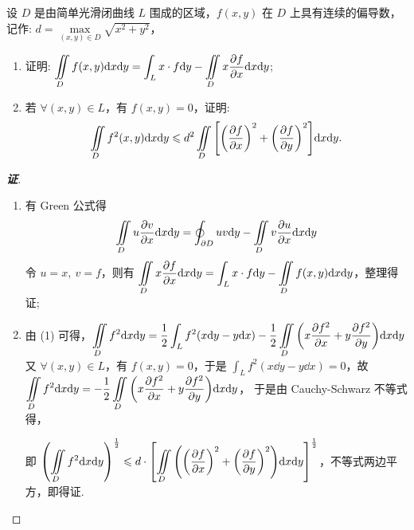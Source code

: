 \begin{example}[2023 西北大学]
    设 $D$ 是由简单光滑闭曲线 $L$ 围成的区域，$f(x,y)$ 在 $D$ 上具有连续的偏导数，记作: $d=\max\limits_{(x,y)\in D}\sqrt{x^2+y^2}$，
    \begin{enumerate}[label=(\arabic{*})]
        \item 证明: $\displaystyle \iint\limits_D f(x,y)\dd x\dd y=\int_L x\cdot f \dd y-\iint\limits_Dx\pdv{f}{x}\dd x\dd y$;
        \item 若 $\forall (x,y)\in L$，有 $f(x,y)=0$，证明:
              $$\iint\limits_D f^2(x,y)\dd x\dd y\leqslant d^2\iint\limits_D\qty[\qty(\pdv{f}{x})^2+\qty(\pdv{f}{y})^2]\dd x\dd y.$$
    \end{enumerate}
\end{example}
\begin{proof}[{\songti \textbf{证}}]
    \begin{enumerate}[label=(\arabic{*})]
        \item 有 Green 公式得 $$\iint\limits_Du\pdv{v}{x}\dd x\dd y=\oint_{\partial D}uv\dd y-\iint\limits_Dv\pdv{u}{x}\dd x\dd y$$
              令 $u=x,~v=f$，则有 $\displaystyle\iint\limits_Dx\pdv{f}{x}\dd x\dd y=\int_Lx\cdot f\dd y-\iint\limits_Df(x,y)\dd x\dd y$，整理得证;
        \item 由 (1) 可得，$\displaystyle \iint\limits_D f^2\dd x\dd y=\dfrac{1}{2}\int_L f^2(x\dd y-y\dd x)-\dfrac{1}{2}\iint\limits_D\qty(x\pdv{f^2}{x}+y\pdv{f^2}{y})\dd x\dd y$
              又 $\forall (x,y)\in L$，有 $f(x,y)=0$，于是 $\displaystyle \int_Lf^2(x\dd y-y\dd x)=0$，故 $\displaystyle \iint\limits_D f^2\dd x\dd y=-\dfrac{1}{2}\iint\limits_D\qty(x\pdv{f^2}{x}+y\pdv{f^2}{y})\dd x\dd y$，
              于是由 Cauchy-Schwarz 不等式得，
              即 $\displaystyle \qty(\iint\limits_Df^2\dd x\dd y)^{\frac{1}{2}}\leqslant d\cdot\qty[\iint\limits_D \qty(\qty(\pdv{f}{x})^2+\qty(\pdv{f}{y})^2)\dd x\dd y]^{\frac{1}{2}}$，不等式两边平方，即得证.
    \end{enumerate}
\end{proof}

